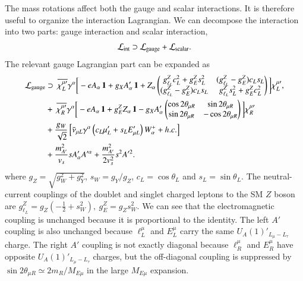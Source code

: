 \documentclass[onecolumn, aps, nofootinbib, prd, preprint, floats, floatfix, amsmath, amssymb, superscriptaddress, preprintnumbers]{revtex4-2}
\begin{document}
The mass rotations affect both the gauge and scalar interactions. It is therefore useful to organize the interaction Lagrangian. We can decompose the interaction into two parts: gauge interaction and scalar interaction,
\begin{equation}
    \mathcal{L}_{\rm int}\supset \mathcal{L}_{\rm gauge} + \mathcal{L}_{\rm scalar}.
\end{equation}
The relevant gauge Lagrangian part can be expanded as
\begin{equation}
\begin{aligned}
\mathcal{L}_{\rm gauge}
&\supset~
\overline{\chi^{\mu\prime}_L}\gamma^\alpha
\bigg[-eA_\alpha\,\mathbf{1}+g_X A'_\alpha\,\mathbf{1} +Z_\alpha
\begin{pmatrix}
g_{\ell_L}^Z c_L^2+g_E^Z s_L^2 & (g_{\ell_L}^Z-g_E^Z)c_Ls_L\\
(g_{\ell_L}^Z-g_E^Z)c_Ls_L & g_{\ell_L}^Z s_L^2+g_E^Z c_L^2
\end{pmatrix}
\bigg] \chi^{\mu\prime}_L,\\
&+~\overline{\chi^{\mu\prime}_R}\gamma^\alpha
\bigg[ -eA_\alpha\,\mathbf{1} +g_E^ZZ_\alpha\,\mathbf{1} -g_XA'_\alpha
\begin{pmatrix}
\cos2\theta_{\mu R} & \sin2\theta_{\mu R}\\
\sin2\theta_{\mu R} & -\cos2\theta_{\mu R}
\end{pmatrix}\bigg]\chi^{\mu\prime}_R\\
&+\frac{g_W}{\sqrt2}
\left[
\bar\nu_{\mu L}\gamma^\alpha
\left(c_L\mu'_L+s_L E'_{\mu L}\right)W^+_\alpha
+h.c.
\right]\\
&+ \frac{m_{A'}^2}{v_s}s A'_\alpha A'^\alpha + \frac{m_{A'}^2}{2 v_s^2}s^2 A'^2.
\end{aligned}
\label{eq:mass-basis-NC}
\end{equation} 
where $g_Z=\sqrt{g_W^2+g_Y^2}$, $s_W=g_Y/g_Z$, $c_L=\cos\theta_L$ and $s_L=\sin\theta_L$. The neutral-current couplings of the doublet and singlet charged leptons to the SM $Z$ boson are $g_{\ell_L}^Z=g_Z\left(-\frac12+s_W^2\right), ~g_E^Z=g_Z s_W^2$. We can see that the electromagnetic coupling is unchanged because it is proportional to the identity. The left $A'$ coupling is also unchanged because $\ell_L^\mu$ and $E_L^\mu$ carry the same $U_A(1)'_{L_\mu-L_\tau}$ charge. The right $A'$ coupling is not exactly diagonal because $\ell_R^\mu$ and $E_R^\mu$ have opposite $U_A(1)'_{L_\mu-L_\tau}$ charges, but the off-diagonal coupling is suppressed by $\sin2\theta_{\mu R}\simeq 2m_R/M_{E\mu}$ in the large $M_{E\mu}$ expansion.
\end{document}
